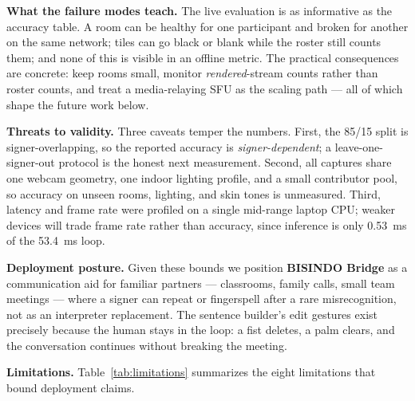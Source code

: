\documentclass{llncs}
\newcommand{\kw}[1]{\textbf{#1}}
\begin{document}
\textbf{What the failure modes teach.} The live evaluation is as
informative as the accuracy table. A room can be healthy for one
participant and broken for another on the same network; tiles can go
black or blank while the roster still counts them; and none of this is
visible in an offline metric. The practical consequences are concrete:
keep rooms small, monitor \emph{rendered}-stream counts rather than
roster counts, and treat a media-relaying SFU as the scaling path ---
all of which shape the future work below.

\textbf{Threats to validity.} Three caveats temper the numbers. First,
the 85/15 split is signer-overlapping, so the reported accuracy is
\emph{signer-dependent}; a leave-one-signer-out protocol is the honest
next measurement. Second, all captures share one webcam geometry, one
indoor lighting profile, and a small contributor pool, so accuracy on
unseen rooms, lighting, and skin tones is unmeasured. Third, latency and
frame rate were profiled on a single mid-range laptop CPU; weaker devices
will trade frame rate rather than accuracy, since inference is only
0.53~ms of the 53.4~ms loop.

\textbf{Deployment posture.} Given these bounds we position \kw{BISINDO
Bridge} as a communication aid for familiar partners --- classrooms,
family calls, small team meetings --- where a signer can repeat or
fingerspell after a rare misrecognition, not as an interpreter
replacement. The sentence builder's edit gestures exist precisely because
the human stays in the loop: a fist deletes, a palm clears, and the
conversation continues without breaking the meeting.

\textbf{Limitations.} Table~\ref{tab:limitations} summarizes the eight
limitations that bound deployment claims.
\end{document}
